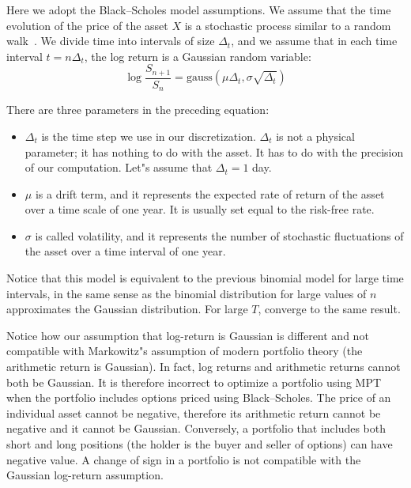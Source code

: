 \documentclass[justified, sixbynine]{tufte-book}
\theoremstyle{plain}%
\newtheorem * {corollary}{Corollary}
\theoremstyle{definition}
\theoremstyle{remark}
\newtheorem * {remark}{Remark}
\newtheorem * {note}{Note}
\begin{document}
\begin{fullwidth}
Here we adopt the Black--Scholes model assumptions.
We assume that the time evolution of the price of the asset $X$ is
a stochastic process similar to a random walk~\cite{shreve}. We divide time into
intervals of size $\Delta _t$, and we assume that in each time interval $%
t=n\Delta _t$, the log return is a Gaussian random variable:
\begin{equation}
\log \frac{S_{n+1}}{S_n} = \textrm{gauss}(\mu\Delta_t, \sigma\sqrt{\Delta_t}) \label{BS}
\end{equation}

There are three parameters in the preceding equation:

\begin{itemize}
\item  $\Delta _t$ is the time step we use in our discretization. $\Delta _t$
is not a physical parameter; it has nothing to do with the asset. It has to
do with the precision of our computation. Let"s assume that $\Delta _t=1$ day.

\item  $\mu $ is a drift term, and it represents the expected rate of return
of the asset over a time scale of one year. It is usually set equal to the risk-free rate.

\item  $\sigma $ is called volatility, and it represents the number of
stochastic fluctuations of the asset over a time interval of one year.
\end{itemize}

Notice that this model is equivalent to the previous binomial model for large time intervals, in the same sense as the binomial distribution for large values of $n$ approximates the Gaussian distribution. For large $T$, converge to the same result.

Notice how our assumption that log-return is Gaussian is different and not compatible with Markowitz"s assumption of modern portfolio theory (the arithmetic return is Gaussian). In fact, log returns and arithmetic returns cannot both be Gaussian. It is therefore incorrect to optimize a portfolio using MPT when the portfolio includes options priced using Black--Scholes. The price of an individual asset cannot be negative, therefore its arithmetic return cannot be negative and it cannot be Gaussian. Conversely, a portfolio that includes both short and long positions (the holder is the buyer and seller of options) can have negative value. A change of sign in a portfolio is not compatible with the Gaussian log-return assumption.


\end{fullwidth}
\end{document}
